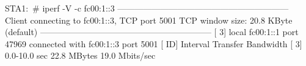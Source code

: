 STA1:~# iperf -V -c fc00:1::3
------------------------------------------------------------
Client connecting to fc00:1::3, TCP port 5001
TCP window size: 20.8 KByte (default)
------------------------------------------------------------
[  3] local fc00:1::1 port 47969 connected with fc00:1::3 port 5001
[ ID] Interval       Transfer     Bandwidth
[  3]  0.0-10.0 sec  22.8 MBytes  19.0 Mbits/sec

